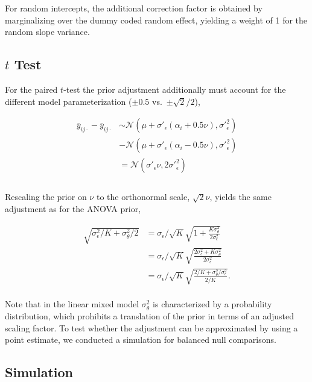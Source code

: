\documentclass[
  a4paper,
  DIV=11,
  numbers=noendperiod,
  oneside]{scrartcl}
\begin{document}
For random intercepts, the additional correction factor is obtained by
marginalizing over the dummy coded random effect, yielding a weight of 1
for the random slope variance.

\hypertarget{t-test}{%
\subsection{\texorpdfstring{\(t\) Test}{t Test}}\label{t-test}}

For the paired \(t\)-test the prior adjustment additionally must account
for the different model parameterization (\(\pm 0.5\)
vs.~\(\pm \sqrt{2}/2\)),

\[
\begin{aligned}
\bar{y}_{ij\cdot} - \bar{y}_{ij\cdot} & \sim \mathcal{N}(\mu + \sigma\prime_\epsilon (\alpha_i + 0.5 \nu), \sigma\prime_\epsilon^2) \\
& - \mathcal{N}(\mu + \sigma\prime_\epsilon (\alpha_i - 0.5 \nu), \sigma\prime_\epsilon^2) \\
  & = \mathcal{N}(\sigma\prime_\epsilon \nu, 2\sigma\prime_\epsilon^2) \\ & \\
\end{aligned}
\]

Rescaling the prior on \(\nu\) to the orthonormal scale,
\(\sqrt{2}\nu\), yields the same adjustment as for the ANOVA prior,

\[
\begin{aligned}
\sqrt{\sigma_\epsilon^2/K + \sigma_\theta^2/2} & = \sigma_\epsilon/\sqrt{K} \sqrt{1 + \frac{K\sigma^2_\theta}{2\sigma_\epsilon^2}} \\
  & = \sigma_\epsilon/\sqrt{K} \sqrt{\frac{2\sigma_\epsilon^2 + K\sigma^2_\theta}{2\sigma_\epsilon^2}} \\
  & = \sigma_\epsilon/\sqrt{K} \sqrt{\frac{2/K + \sigma^2_\theta/\sigma_\epsilon^2}{2/K}}. \\
\end{aligned}
\]

Note that in the linear mixed model \(\sigma_\theta^2\) is characterized
by a probability distribution, which prohibits a translation of the
prior in terms of an adjusted scaling factor. To test whether the
adjustment can be approximated by using a point estimate, we conducted a
simulation for balanced null comparisons.

\hypertarget{simulation-1}{%
\subsection{Simulation}\label{simulation-1}}
\end{document}
